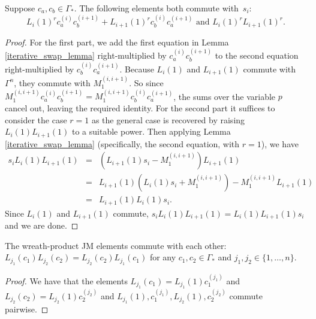 \documentclass[ALCO,Unicode]{cedram}
\begin{document}
\begin{proposition} \label{special_commuting_proposition}
Suppose $c_a, c_b \in \Gamma_*$. The following elements both commute with~$s_i$:
 \[
 L_i(1)^r c_a^{(i)}c_b^{(i+1)} + L_{i+1}(1)^r c_b^{(i)} c_a^{(i+1)}\text{ and }L_i(1)^r L_{i+1}(1)^r.
 \]
\end{proposition}

\begin{proof}
For the first part, we add the first equation in Lemma \ref{iterative_swap_lemma} right-multiplied by $c_a^{(i)}c_b^{(i+1)}$ to the second equation right-multiplied by $ c_b^{(i)}c_a^{(i+1)}$. Because $L_i(1)$ and $L_{i+1}(1)$ commute with $\Gamma^n$, they commute with $M_1^{(i,i+1)}$. So since $M_1^{(i,i+1)}  c_a^{(i)}c_b^{(i+1)} =  M_1^{(i,i+1)}c_b^{(i)}c_a^{(i+1)}$, the sums over the variable $p$ cancel out, leaving the required identity. For the second part it suffices to consider the case $r=1$ as the general case is recovered by raising $L_i(1)L_{i+1}(1)$ to a suitable power. Then applying Lemma \ref{iterative_swap_lemma} (specifically, the second equation, with $r=1$), we have
\begin{eqnarray*}
s_i L_i(1) L_{i+1}(1) &=& (L_{i+1}(1)s_i - M_1^{(i,i+1)}) L_{i+1}(1) \\
&=& L_{i+1}(1) (L_i(1)s_i + M_1^{(i,i+1)}) - M_1^{(i,i+1)} L_{i+1}(1) \\
&=& L_{i+1}(1)L_i(1)s_i.
\end{eqnarray*}
Since $L_i(1)$ and $L_{i+1}(1)$ commute, $s_i L_i(1)L_{i+1}(1) = L_{i}(1)L_{i+1}(1)s_i$ and we are done.\qedhere
\end{proof}


\begin{proposition} \label{gen_JM_elts_commute}
The wreath-product JM elements commute with each other: $L_{j_1}(c_1) L_{j_2}(c_2)=L_{j_2}(c_2) L_{j_1}(c_1)$ for any $c_1, c_2 \in \Gamma_*$ and $j_1, j_2 \in \{1,\ldots, n\}$.
\end{proposition}
\begin{proof}
We have that the elements $L_{j_1}(c_1) = L_{j_1}(1) c_1^{(j_1)}$ and $L_{j_2}(c_2) = L_{j_2}(1) c_2^{(j_2)}$ and $L_{j_1}(1), c_1^{(j_1)}, L_{j_2}(1), c_2^{(j_2)}$ commute pairwise.
\end{proof}
\end{document}
